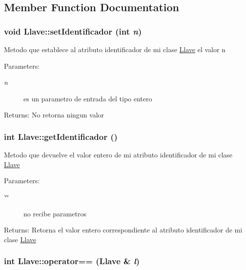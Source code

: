 \subsection{Member Function Documentation}
\hypertarget{classLlave_c80fb30127165c307bc38873545e57fc}{
\subsubsection[setIdentificador]{\setlength{\rightskip}{0pt plus 5cm}void Llave::setIdentificador (int {\em n})}}
\label{classLlave_c80fb30127165c307bc38873545e57fc}


Metodo que establece al atributo identificador de mi clase \hyperlink{classLlave}{Llave} el valor n \begin{Desc}
\item[Parameters:]
\begin{description}
\item[{\em n}]es un parametro de entrada del tipo entero \end{description}
\end{Desc}
\begin{Desc}
\item[Returns:]No retorna ningun valor \end{Desc}
\hypertarget{classLlave_21a4a576a987126d469a6eecb167aed1}{
\subsubsection[getIdentificador]{\setlength{\rightskip}{0pt plus 5cm}int Llave::getIdentificador ()}}
\label{classLlave_21a4a576a987126d469a6eecb167aed1}


Metodo que devuelve el valor entero de mi atributo identificador de mi clase \hyperlink{classLlave}{Llave} \begin{Desc}
\item[Parameters:]
\begin{description}
\item[{\em \char`\"{}\char`\"{}}]no recibe parametros \end{description}
\end{Desc}
\begin{Desc}
\item[Returns:]Retorna el valor entero correspondiente al atributo identificador de mi clase \hyperlink{classLlave}{Llave} \end{Desc}
\hypertarget{classLlave_3ed579466201fc80172774d871ece003}{
\subsubsection[operator==]{\setlength{\rightskip}{0pt plus 5cm}int Llave::operator== ({\bf Llave} \& {\em l})}}
\label{classLlave_3ed579466201fc80172774d871ece003}


